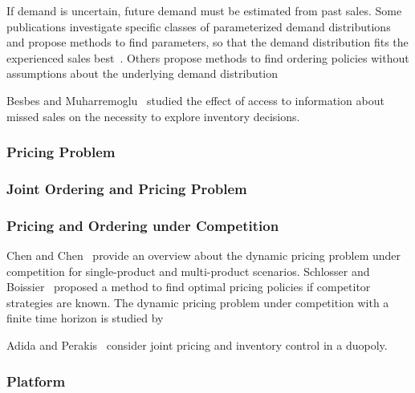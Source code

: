 If demand is uncertain, future demand must be estimated from past sales.
Some publications investigate specific classes of parameterized demand distributions and propose methods to find parameters, so that the demand distribution fits the experienced sales best~\cite{azoury1985bayes}.
Others propose methods to find ordering policies without assumptions about the underlying demand distribution~\cite{DBLP:journals/mor/LeviRS07,huh2011adaptive,ban2017big}

Besbes and Muharremoglu~\cite{DBLP:journals/mansci/BesbesM13} studied the effect of access to information about missed sales on the necessity to explore inventory decisions.

\subsubsection*{Pricing Problem}

\subsubsection*{Joint Ordering and Pricing Problem}



\subsubsection*{Pricing and Ordering under Competition}
Chen and Chen~\cite{chen2015recent} provide an overview about the dynamic pricing problem under competition for single-product and multi-product scenarios.
Schlosser and Boissier~\cite{Schlosser_2017} proposed a method to find optimal pricing policies if competitor strategies are known.
The dynamic pricing problem under competition with a finite time horizon is studied by~\cite{DBLP:journals/mansci/Martinez-de-AlbenizT11,Schlosser_2018}

Adida and Perakis~\cite{DBLP:journals/ior/AdidaP10} consider joint pricing and inventory control in a duopoly.

\subsubsection*{Platform}


